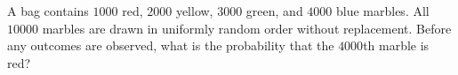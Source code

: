 A bag contains $1000$ red, $2000$ yellow, $3000$ green, and $4000$ blue marbles. All $10000$ marbles are drawn in uniformly random order without replacement. Before any outcomes are observed, what is the probability that the $4000$th marble is red?

